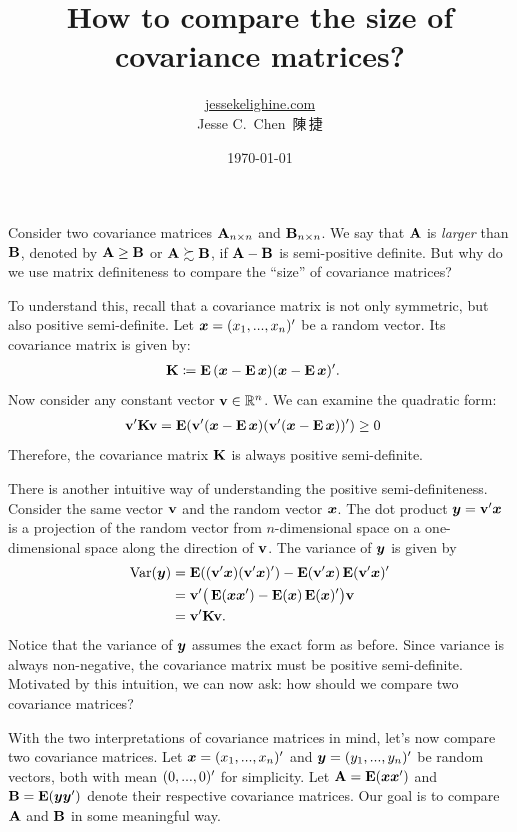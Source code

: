 \documentclass[a4paper]{article}
\title{How to compare the size of covariance matrices?}
\author{\href{https://jessekelighine.com}{jessekelighine.com}\\Jesse C.\ Chen\ 陳\,捷}
\date{\today}
\begin{document}
\maketitle

\begin{multicols}{2}

\noindent
Consider two covariance matrices $\AA_{n\times n}$ and $\BB_{n\times n}$.
We say that $\AA$ is \emph{larger} than $\BB$,
denoted by $\AA\geq \BB$ or $\AA\succsim \BB$,
if $\AA-\BB$ is semi-positive definite.
But why do we use matrix definiteness to compare the ``size'' of covariance matrices?

To understand this,
recall that a covariance matrix is not only symmetric,
but also positive semi-definite.
Let $\xx=(x_1,...,x_n)\T$ be a random vector.
Its covariance matrix is given by:
\begin{align*}
	\KK &\coloneqq \E{(\xx-\E{\xx})(\xx-\E{\xx})\T}.
\end{align*}
Now consider any constant vector $\vv\in\reals^n$.
We can examine the quadratic form:
\begin{align*}
	\vv\T \KK \vv &= \E(\vv\T(\xx-\E{\xx})(\vv\T(\xx-\E{\xx}))\T) \geq 0
\end{align*}
Therefore, the covariance matrix $\KK$ is always positive semi-definite.

There is another intuitive way of understanding the positive semi-definiteness.
Consider the same vector $\vv$ and the random vector $\xx$.
The dot product $\yy=\vv\T \xx$ is a projection of the random vector from $n$-dimensional
space on a one-dimensional space along the direction of $\vv$.
The variance of $\yy$ is given by
\begin{align*}
	\var(\yy)
	&= \E((\vv\T \xx)(\vv\T \xx)\T ) - \E(\vv\T \xx)\E(\vv\T \xx)\T  \\
	&= \vv\T \big(\E(\xx\xx\T ) - \E(\xx)\E(\xx)\T \big)\vv \\
	&= \vv\T \KK\vv.
\end{align*}
Notice that the variance of $\yy$ assumes the exact form as before.
Since variance is always non-negative, the covariance matrix must be positive semi-definite.
Motivated by this intuition, we can now ask: how should we compare two covariance matrices?

With the two interpretations of covariance matrices in mind,
let's now compare two covariance matrices.
Let $\xx=(x_1,...,x_n)\T$ and $\yy=(y_1,...,y_n)\T$ be random vectors, both with mean $(0,...,0)\T$ for simplicity.
Let $\AA=\E(\xx\xx\T)$ and $\BB=\E(\yy\yy\T)$ denote their respective covariance matrices.
Our goal is to compare $\AA$ and $\BB$ in some meaningful way.


\end{multicols}
\end{document}
